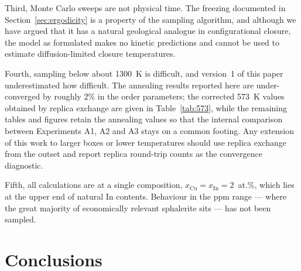 \documentclass[11pt,a4paper]{article}
\begin{document}
Third, Monte Carlo sweeps are not physical time. The freezing documented in
Section~\ref{sec:ergodicity} is a property of the sampling algorithm, and
although we have argued that it has a natural geological analogue in
configurational closure, the model as formulated makes no kinetic predictions
and cannot be used to estimate diffusion-limited closure temperatures.

Fourth, sampling below about 1300~K is difficult, and version~1 of this paper
underestimated how difficult. The annealing results reported here are
under-converged by roughly 2\% in the order parameters; the corrected 573~K
values obtained by replica exchange are given in Table~\ref{tab:573}, while the
remaining tables and figures retain the annealing values so that the internal
comparison between Experiments A1, A2 and A3 stays on a common footing. Any
extension of this work to larger boxes or lower temperatures should use replica
exchange from the outset and report replica round-trip counts as the convergence
diagnostic.

Fifth, all calculations are at a single composition,
$x_{\mathrm{Cu}} = x_{\mathrm{In}} = 2$~at.\%, which lies at the upper end of
natural In contents. Behaviour in the ppm range --- where the great majority of
economically relevant sphalerite sits --- has not been sampled.

\section{Conclusions}
\end{document}
